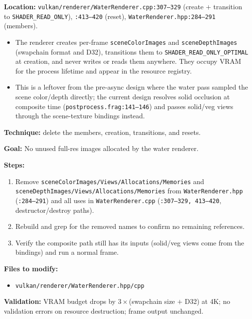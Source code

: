 \documentclass[11pt,a4paper]{article}
\begin{document}
\textbf{Location:} \texttt{vulkan/renderer/WaterRenderer.cpp:307--329} (create $+$ transition to \texttt{SHADER\_READ\_ONLY}), \texttt{:413--420} (reset),
\texttt{WaterRenderer.hpp:284--291} (members).

\begin{itemize}
    \item The renderer creates per-frame \texttt{sceneColorImages} and \texttt{sceneDepthImages} (swapchain format and D32), transitions them to
    \texttt{SHADER\_READ\_ONLY\_OPTIMAL} at creation, and never writes or reads them anywhere. They occupy VRAM for the process lifetime and appear in the resource registry.
    \item This is a leftover from the pre-async design where the water pass sampled the scene color/depth directly; the current design resolves solid occlusion at composite time
    (\texttt{postprocess.frag:141--146}) and passes solid/veg views through the scene-texture bindings instead.
\end{itemize}

\textbf{Technique:} delete the members, creation, transitions, and resets.

\begin{tcolorbox}[promptbox={Prompt: Remove the Dead Scene Color/Depth Targets from WaterRenderer}]
\textbf{Goal:} No unused full-res images allocated by the water renderer.

\textbf{Steps:}
\begin{enumerate}
    \item Remove \texttt{sceneColorImages/Views/Allocations/Memories} and \texttt{sceneDepthImages/Views/Allocations/Memories} from \texttt{WaterRenderer.hpp}
    (\texttt{:284--291}) and all uses in \texttt{WaterRenderer.cpp} (\texttt{:307--329, 413--420}, destructor/destroy paths).
    \item Rebuild and grep for the removed names to confirm no remaining references.
    \item Verify the composite path still has its inputs (solid/veg views come from the bindings) and run a normal frame.
\end{enumerate}

\textbf{Files to modify:}
\begin{itemize}
    \item \texttt{vulkan/renderer/WaterRenderer.hpp/cpp}
\end{itemize}

\textbf{Validation:} VRAM budget drops by $3\times$(swapchain size $+$ D32) at 4K; no validation errors on resource destruction; frame output unchanged.
\end{tcolorbox}
\end{document}
